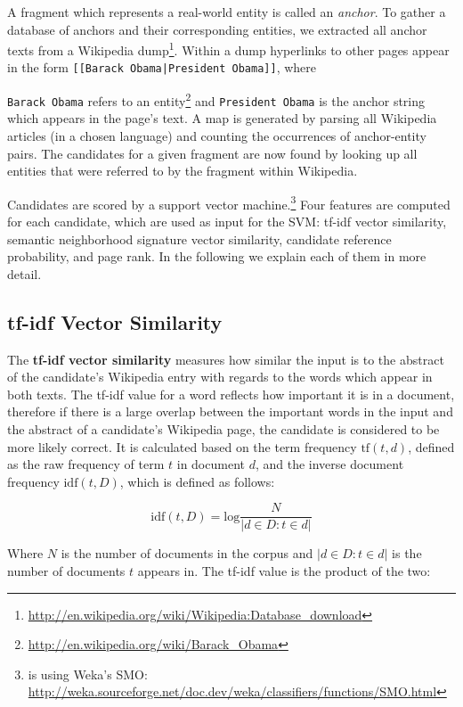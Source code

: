\documentclass[runningheads,a4paper]{llncs}
\begin{document}
A fragment which represents a real-world entity is called an \textit{anchor}. To gather a database of anchors and their corresponding entities, we extracted all anchor texts from a Wikipedia dump\footnote{\url{http://en.wikipedia.org/wiki/Wikipedia:Database_download}}. Within a dump hyperlinks to other pages appear in the form \texttt{[[Barack Obama|President Obama]]}, 
where {\texttt{Barack Obama} refers to an entity\footnote{\url{http://en.wikipedia.org/wiki/Barack_Obama}} and \texttt{President Obama} is the anchor string which appears in the page's text. A map is generated by parsing all Wikipedia articles (in a chosen language) and counting the occurrences of anchor-entity pairs. The candidates for a given fragment are now found by looking up all entities that were referred to by the fragment within Wikipedia. 

Candidates are scored by a support vector machine.\footnote{{\acronym} is using Weka's SMO: \url{http://weka.sourceforge.net/doc.dev/weka/classifiers/functions/SMO.html}} Four features are computed for each candidate, which are used as input for the SVM: tf-idf vector similarity, semantic neighborhood signature vector similarity, candidate reference probability, and page rank. In the following we explain each of them in more detail.

\subsection{tf-idf Vector Similarity}

The \textbf{tf-idf vector similarity} measures how similar the input is to the abstract of the candidate's Wikipedia entry with regards to the words which appear in both texts. The tf-idf value for a word reflects how important it is in a document, therefore if there is a large overlap between the important words in the input and the abstract of a candidate's Wikipedia page, the candidate is considered to be more likely correct. It is calculated based on the term frequency $\mathrm{tf}(t,d)$, defined as the raw frequency of term $t$ in document $d$, and the inverse document frequency $\mathrm{idf}(t,D)$, which is defined as follows:

$$\mathrm{idf}(t, D) = \mathrm{log}\frac{N}{|{d \in D : t \in d}|}$$

Where $N$ is the number of documents in the corpus and $|{d \in D : t \in d}|$ is the number of documents $t$ appears in. The tf-idf value is the product of the two:

}
\end{document}
